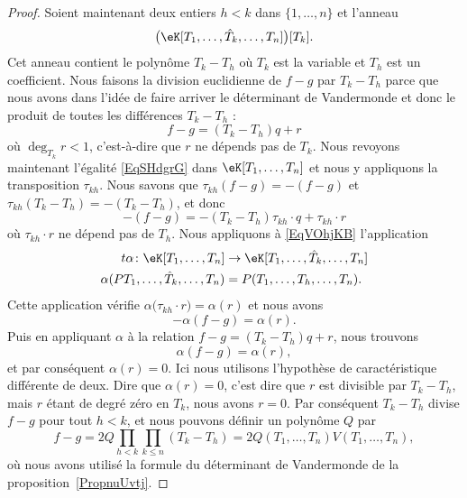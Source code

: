 \begin{proof}
    Soient maintenant deux entiers \( h<k\) dans \( \{ 1,\ldots, n \}\) et l'anneau
    \begin{equation}
        \big( \eK[T_1,\ldots, \hat T_k,\ldots, T_n] \big)[T_k].
    \end{equation}
    Cet anneau contient le polynôme \( T_k-T_h\) où \( T_k\) est la variable et \( T_h\) est un coefficient. Nous faisons la division euclidienne de \( f-g\) par  \( T_k-T_h\) parce que nous avons dans l'idée de faire arriver le déterminant de Vandermonde et donc le produit de toutes les différences \( T_k-T_h\) :
    \begin{equation}    \label{EqSHdgrG}
        f-g=(T_k-T_h)q+r
    \end{equation}
    où \( \deg_{T_k}r<1\), c'est-à-dire que \( r\) ne dépends pas de \( T_k\). Nous revoyons maintenant l'égalité \eqref{EqSHdgrG} dans \( \eK[T_1,\ldots, T_n]\) et nous y appliquons la transposition \( \tau_{kh}\). Nous savons que \( \tau_{kh}(f-g)=-(f-g)\) et \( \tau_{kh}(T_k-T_h)=-(T_k-T_h)\), et donc
    \begin{equation}    \label{EqVOhjKB}
        -(f-g)=-(T_k-T_h)\tau_{kh}\cdot   q+\tau_{kh}\cdot r
    \end{equation}
    où \(\tau_{kh}\cdot r\) ne dépend pas de \( T_h\). Nous appliquons à \eqref{EqVOhjKB} l'application
    \begin{equation}
        \begin{aligned}
            t\alpha\colon \eK[T_1,\ldots, T_n]&\to \eK[T_1,\ldots, \hat T_k,\ldots, T_n] \\
            \alpha(PT_1,\ldots, \hat T_k,\ldots, T_n)&=P(T_1,\ldots, T_h,\ldots, T_n).
        \end{aligned}
    \end{equation}
    Cette application vérifie \( \alpha\big( \tau_{kh}\cdot r \big)=\alpha(r)\) et nous avons
    \begin{equation}
        -\alpha(f-g)=\alpha(r).
    \end{equation}
    Puis en appliquant \( \alpha\) à la relation \( f-g=(T_k-T_h)q+r\), nous trouvons
    \begin{equation}
        \alpha(f-g)=\alpha(r),
    \end{equation}
    et par conséquent \( \alpha(r)=0\). Ici nous utilisons l'hypothèse de caractéristique différente de deux. Dire que \( \alpha(r)=0\), c'est dire que \( r\) est divisible par \( T_k-T_h\), mais \( r\) étant de degré zéro en \( T_k\), nous avons \( r=0\). Par conséquent \( T_k-T_h\) divise \( f-g\) pour tout \( h<k\), et nous pouvons définir un polynôme \( Q\) par
    \begin{equation}    \label{EqrnbgdA}
        f-g=2Q\prod_{h<k}\prod_{k\leq n}(T_k-T_h)=2Q(T_1,\ldots, T_n)V(T_1,\ldots, T_n),
    \end{equation}
    où nous avons utilisé la formule du déterminant de Vandermonde de la proposition~\ref{PropnuUvtj}.


\end{proof}
